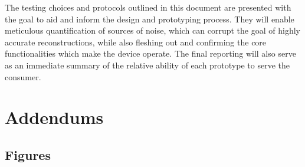 \documentclass{article}
\begin{document}
The testing choices and protocols outlined in this document are presented with the goal to aid and inform the design and prototyping process. They will enable meticulous quantification of sources of noise, which can corrupt the goal of highly accurate reconstructions, while also fleshing out and confirming the core functionalities which make the device operate. The final reporting will also serve as an immediate summary of the relative ability of each prototype to serve the consumer.

\section{Addendums}
\label{sec:addendums}

\subsection{Figures}
\label{sec:figures}

\newpage
{}


\end{document}
